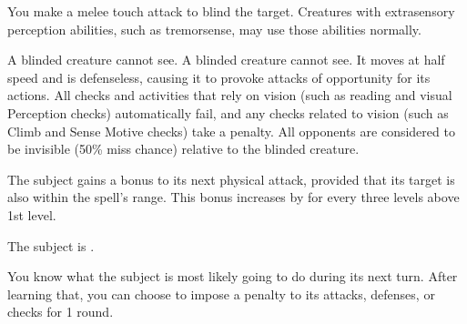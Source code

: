 \begin{spelleffect}
    You make a melee touch attack to blind the target. Creatures with extrasensory perception abilities, such as tremorsense, may use those abilities normally.
\end{spelleffect}
\begin{spellnotes}
    A blinded creature cannot see. A blinded creature cannot see. It moves at half speed and is defenseless, causing it to provoke attacks of opportunity for its actions. All checks and activities that rely on vision (such as reading and visual Perception checks) automatically fail, and any checks related to vision (such as Climb and Sense Motive checks) take a  penalty. All opponents are considered to be invisible (50\% miss chance) relative to the blinded creature.
\end{spellnotes}

\begin{spelleffect}
    The subject gains a  bonus to its next physical attack, provided that its target is also within the spell's range. This bonus increases by  for every three levels above 1st level.
\end{spelleffect}

\begin{spelleffect}
    The subject is \slowed.
\end{spelleffect}

\begin{spelleffect}
    You know what the subject is most likely going to do during its next turn. After learning that, you can choose to impose a  penalty to its attacks, defenses, or checks for 1 round.
\end{spelleffect}
